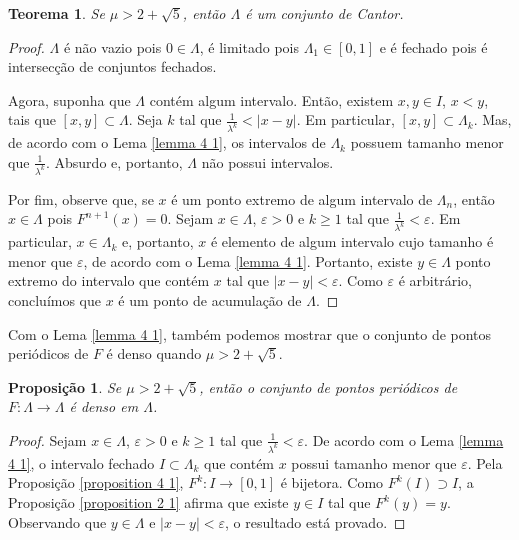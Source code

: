 \documentclass[a4paper, 12pt]{article}
\theoremstyle{definition}
\theoremstyle{plain}
\newtheorem{proposition}[definition]{Proposição}
\theoremstyle{plain}
\theoremstyle{plain}
\newtheorem{theorem}[definition]{Teorema}
\theoremstyle{remark}
\begin{document}
\begin{theorem}
\label{theorem 4 1}
Se $\mu > 2 + \sqrt{5}$, então $\Lambda$ é um conjunto de Cantor.
\end{theorem}

\begin{proof}
$\Lambda$ é não vazio pois $0 \in \Lambda$, é limitado pois $\Lambda_1 \in [0, 1]$ e é fechado pois é intersecção de conjuntos fechados.

Agora, suponha que $\Lambda$ contém algum intervalo. Então, existem $x, y \in I$, $x < y$, tais que $[x, y] \subset \Lambda$. Seja $k$ tal que $\frac{1}{\lambda^k} < |x - y|$. Em particular, $[x, y] \subset \Lambda_k$. Mas, de acordo com o Lema \ref{lemma 4 1}, os intervalos de $\Lambda_k$ possuem tamanho menor que $\frac{1}{\lambda^k}$. Absurdo e, portanto, $\Lambda$ não possui intervalos.

Por fim, observe que, se $x$ é um ponto extremo de algum intervalo de $\Lambda_n$, então $x \in \Lambda$ pois $F^{n+1}(x) = 0$. Sejam $x \in \Lambda$, $\varepsilon > 0$ e $k \geq 1$ tal que $\frac{1}{\lambda^k} < \varepsilon$. Em particular, $x \in \Lambda_k$ e, portanto, $x$ é elemento de algum intervalo cujo tamanho é menor que $\varepsilon$, de acordo com o Lema \ref{lemma 4 1}. Portanto, existe $y \in \Lambda$ ponto extremo do intervalo que contém $x$ tal que $|x - y| < \varepsilon$. Como $\varepsilon$ é arbitrário, concluímos que $x$ é um ponto de acumulação de $\Lambda$.
\end{proof}

Com o Lema \ref{lemma 4 1}, também podemos mostrar que o conjunto de pontos periódicos de $F$ é denso quando $\mu > 2 + \sqrt{5}$.

\begin{proposition}
\label{proposition 4 2}
Se $\mu > 2 + \sqrt{5}$, então o conjunto de pontos periódicos de $F: \Lambda \rightarrow \Lambda$ é denso em $\Lambda$.
\end{proposition}

\begin{proof}
Sejam $x \in \Lambda$, $\varepsilon > 0$ e $k \geq 1$ tal que $\frac{1}{\lambda^k} < \varepsilon$. De acordo com o Lema \ref{lemma 4 1}, o intervalo fechado $I \subset \Lambda_k$ que contém $x$ possui tamanho menor que $\varepsilon$. Pela Proposição \ref{proposition 4 1}, $F^k: I \rightarrow [0, 1]$ é bijetora. Como $F^k(I) \supset I$, a Proposição \ref{proposition 2 1} afirma que existe $y \in I$ tal que $F^k(y) = y$. Observando que $y \in \Lambda$ e $|x - y| < \varepsilon$, o resultado está provado.
\end{proof}
\end{document}
